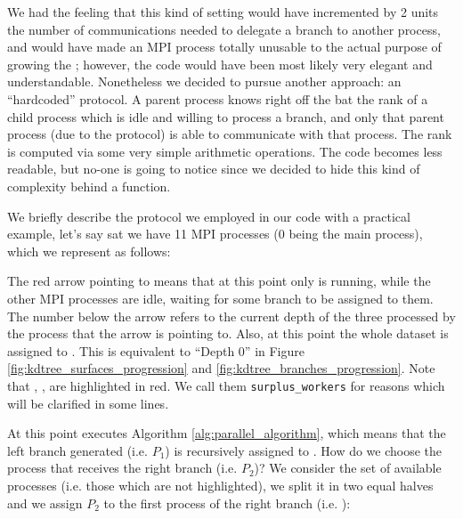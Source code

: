 \documentclass{article}
\begin{document}
We had the feeling that this kind of setting would have incremented by 2 units
the number of communications needed to delegate a branch to another process, and
would have made an MPI process totally unusable to the actual purpose of growing
the \kdtree{}; however, the code would have been most likely very elegant and
understandable. Nonetheless we decided to pursue another approach: an
``hardcoded'' protocol. A parent process knows right off the bat the rank
of a child process which is idle and willing to process a branch, and only that
parent process (due to the protocol) is able to communicate with that process.
The rank is computed via some very simple arithmetic operations. The code
becomes less readable, but no-one is going to notice since we decided to hide
this kind of complexity behind a function.

We briefly describe the protocol we employed in our code with a practical
example, let's say sat we have 11 MPI processes (0 being the main process),
which we represent as follows:

\begin{figure}[H]
    \centering
\end{figure}

The red arrow pointing to  means that at this point only  is
running, while the other MPI processes are idle, waiting for some branch to be
assigned to them. The number below the arrow refers to the current depth of the
three processed by the process that the arrow is pointing to. Also, at this
point the whole dataset is assigned to . This is equivalent to
``Depth 0'' in Figure \ref{fig:kdtree_surfaces_progression} and
\ref{fig:kdtree_branches_progression}. Note that , , 
are highlighted in red. We call them \texttt{surplus\_workers} for reasons which
will be clarified in some lines.

At this point  executes Algorithm \ref{alg:parallel_algorithm},
which means that the left branch generated (i.e. $P_1$) is recursively assigned
to . How do we choose the process that receives the right branch (i.e.
$P_2$)? We consider the set of available processes (i.e. those which are not
highlighted), we split it in two equal halves and we assign $P_2$ to the first
process of the right branch (i.e. ):
\end{document}
